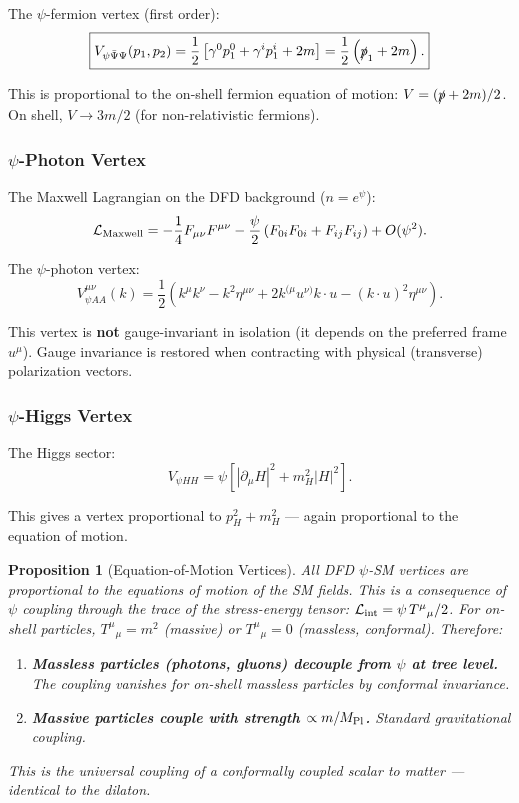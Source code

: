 \documentclass[11pt,a4paper]{article}
\newtheorem{proposition}{Proposition}
\begin{document}
The $\psi$-fermion vertex (first order):
\begin{equation}
\boxed{V_{\psi\bar\Psi\Psi}(p_1,p_2) = \frac{1}{2}\left[\gamma^0 p_1^0 + \gamma^i p_1^i + 2m\right]
= \frac{1}{2}\left(\slashed{p}_1 + 2m\right).}
\end{equation}

This is proportional to the on-shell fermion equation of motion: $V = (\slashed{p}+2m)/2$. On shell, $V \to 3m/2$ (for non-relativistic fermions).

\subsubsection{$\psi$-Photon Vertex}

The Maxwell Lagrangian on the DFD background ($n = e^\psi$):
\begin{equation}
\mathcal{L}_{\rm Maxwell} = -\frac{1}{4}F_{\mu\nu}F^{\mu\nu}
- \frac{\psi}{2}\left(F_{0i}F_{0i} + F_{ij}F_{ij}\right) + O(\psi^2).
\end{equation}

The $\psi$-photon vertex:
\begin{equation}
\boxed{V_{\psi AA}^{\mu\nu}(k) = \frac{1}{2}\left(k^\mu k^\nu - k^2\eta^{\mu\nu} + 2k^{(\mu}u^{\nu)}k\cdot u - (k\cdot u)^2\eta^{\mu\nu}\right).}
\end{equation}

This vertex is \textbf{not} gauge-invariant in isolation (it depends on the preferred frame $u^\mu$). Gauge invariance is restored when contracting with physical (transverse) polarization vectors.

\subsubsection{$\psi$-Higgs Vertex}

The Higgs sector:
\begin{equation}
V_{\psi HH} = \psi\left[|\partial_\mu H|^2 + m_H^2|H|^2\right].
\end{equation}

This gives a vertex proportional to $p_H^2 + m_H^2$ --- again proportional to the equation of motion.

\begin{proposition}[Equation-of-Motion Vertices]
All DFD $\psi$-SM vertices are proportional to the equations of motion of the SM fields. This is a consequence of $\psi$ coupling through the trace of the stress-energy tensor: $\mathcal{L}_{\rm int} = \psi\,T^\mu{}_\mu/2$. For on-shell particles, $T^\mu{}_\mu = m^2$ (massive) or $T^\mu{}_\mu = 0$ (massless, conformal). Therefore:
\begin{enumerate}
\item \textbf{Massless particles (photons, gluons) decouple from $\psi$ at tree level.} The coupling vanishes for on-shell massless particles by conformal invariance.
\item \textbf{Massive particles couple with strength $\propto m/M_{\rm Pl}$.} Standard gravitational coupling.
\end{enumerate}
This is the universal coupling of a conformally coupled scalar to matter --- identical to the dilaton.
\end{proposition}
\end{document}
